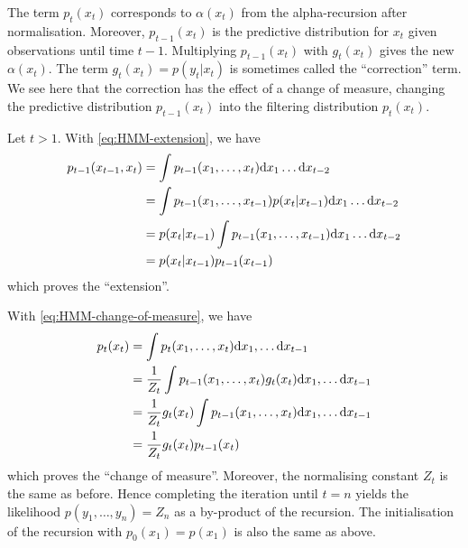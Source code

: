 \begin{exenumerate}
  The term $p_{t}(x_t)$ corresponds to $\alpha(x_t)$ from the
  alpha-recursion after normalisation. Moreover, $p_{t-1}(x_t)$ is the
  predictive distribution for $x_t$ given observations until time
  $t-1$. Multiplying $p_{t-1}(x_t)$ with $g_t(x_t)$ gives the new
  $\alpha(x_t)$. The term $g_t(x_t) = p(y_t|x_t)$ is sometimes called
  the ``correction'' term. We see here that the correction has the
  effect of a change of measure, changing the predictive distribution
  $p_{t-1}(x_t)$ into the filtering distribution $p_t(x_t)$.
  
  \begin{solution}
  Let $t>1$. With \eqref{eq:HMM-extension}, we have
    \begin{align}
      p_{t-1}(x_{t-1}, x_t) & = \int p_{t-1}(x_1, \ldots, x_t) \mathrm{d} x_1 \ldots \mathrm{d} x_{t-2}\\
    &=  \int p_{t-1}(x_1, \ldots, x_{t-1}) p(x_t|x_{t-1})  \mathrm{d} x_1 \ldots \mathrm{d} x_{t-2}\\
      &=  p(x_t|x_{t-1})  \int p_{t-1}(x_1, \ldots, x_{t-1}) \mathrm{d} x_1 \ldots \mathrm{d} x_{t-2}\\
      & =  p(x_t|x_{t-1}) p_{t-1}(x_{t-1})
    \end{align}
    which proves the ``extension''.

    With \eqref{eq:HMM-change-of-measure}, we have
    \begin{align}
      p_t(x_t) & = \int  p_{t}(x_1, \ldots, x_{t}) \mathrm{d} x_1, \ldots \mathrm{d} x_{t-1}\\
      &=  \frac{1}{Z_t} \int p_{t-1}(x_1, \ldots, x_t) g_t(x_t) \mathrm{d} x_1, \ldots \mathrm{d} x_{t-1}\\
      & = \frac{1}{Z_t} g_t(x_t) \int p_{t-1}(x_1, \ldots, x_t)  \mathrm{d} x_1, \ldots \mathrm{d} x_{t-1}\\
      & = \frac{1}{Z_t} g_t(x_t) p_{t-1}(x_t)
    \end{align}
    which proves the ``change of measure''. Moreover, the normalising
    constant $Z_t$ is the same as before. Hence completing the
    iteration until $t=n$ yields the likelihood $p(y_1, \ldots, y_n)=
    Z_n$ as a by-product of the recursion. The initialisation of the
    recursion with $p_0(x_1)=p(x_1)$ is also the same as above.
      
  \end{solution}
  
\end{exenumerate}




